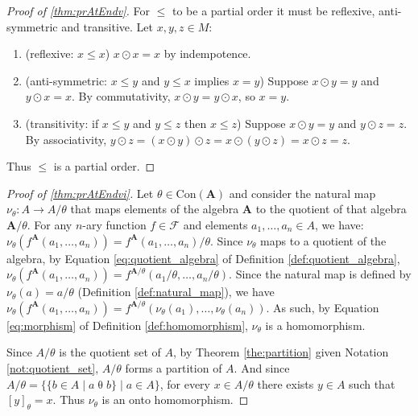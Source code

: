 \label{proofsection:prAtEndv}\begin{proof}[Proof of \autoref{thm:prAtEndv}]\label{proof:prAtEndv}For $\leq $ to be a partial order it must be reflexive, anti-symmetric and transitive. Let $x, y, z \in M$: \begin {enumerate}[itemsep=2pt, topsep=2pt,parsep=0pt,partopsep=0pt] \item (reflexive: $x \leq x$) $x \odot x = x$ by indempotence. \item (anti-symmetric: $x \leq y$ and $y \leq x$ implies $x = y$) Suppose $x \odot y = y$ and $y \odot x = x$. By commutativity, $x \odot y = y \odot x$, so $x = y$. \item (transitivity: if $x \leq y$ and $y \leq z$ then $x \leq z$) Suppose $x \odot y = y$ and $y \odot z = z$. By associativity, $y \odot z = (x \odot y) \odot z = x \odot (y \odot z) = x \odot z = z$. \end {enumerate} Thus $\leq $ is a partial order.\end{proof}
\label{proofsection:prAtEndvi}\begin{proof}[Proof of \autoref{thm:prAtEndvi}]\label{proof:prAtEndvi}Let $\theta \in \mathrm {Con}(\boldsymbol {A})$ and consider the natural map $\nu _{\theta } : A \rightarrow A / \theta $ that maps elements of the algebra $\boldsymbol {A}$ to the quotient of that algebra $\boldsymbol {A} / \theta $. For any $n$-ary function $f \in \mathcal {F}$ and elements $a_1, \dots , a_n \in A$, we have: $\nu _{\theta }(f^{\boldsymbol {A}}(a_1, \dots , a_n)) = f^{\boldsymbol {A}}(a_1, \dots , a_n) / \theta $. Since $\nu _{\theta }$ maps to a quotient of the algebra, by Equation \ref {eq:quotient_algebra} of Definition \ref {def:quotient_algebra}, $\nu _{\theta }(f^{\boldsymbol {A}}(a_1, \dots , a_n)) = f^{\boldsymbol {A} / \theta }(a_1 / \theta , \dots , a_n / \theta )$. Since the natural map is defined by $\nu _{\theta }(a) = a / \theta $ (Definition \ref {def:natural_map}), we have $\nu _{\theta }(f^{\boldsymbol {A}}(a_1, \dots , a_n)) = f^{\boldsymbol {A} / \theta }(\nu _{\theta }(a_1), \dots , \nu _{\theta }(a_n))$. As such, by Equation \ref {eq:morphism} of Definition \ref {def:homomorphism}, $\nu _{\theta }$ is a homomorphism. \par Since $A / \theta $ is the quotient set of $A$, by Theorem \ref {the:partition} given Notation \ref {not:quotient_set}, $A / \theta $ forms a partition of $A$. And since $A / \theta = \{\{b \in A \mid a \mathrel {\theta } b\} \mid a \in A\}$, for every $x \in A / \theta $ there exists $y \in A$ such that $[y]_{\theta } = x$. Thus $\nu _{\theta }$ is an onto homomorphism.\end{proof}
